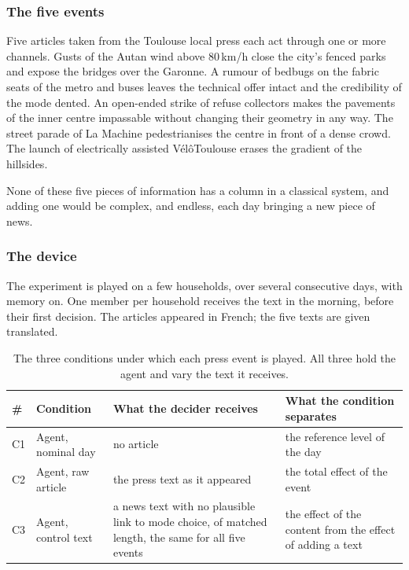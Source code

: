 \subsubsection{The five events}

Five articles taken from the Toulouse local press each act through one or more channels. Gusts of the Autan wind above 80\,km/h close the city's fenced parks and expose the bridges over the Garonne. A rumour of bedbugs on the fabric seats of the metro and buses leaves the technical offer intact and the credibility of the mode dented. An open-ended strike of refuse collectors makes the pavements of the inner centre impassable without changing their geometry in any way. The street parade of La Machine pedestrianises the centre in front of a dense crowd. The launch of electrically assisted V\'el\^oToulouse erases the gradient of the hillsides.

None of these five pieces of information has a column in a classical system, and adding one would be complex, and endless, each day bringing a new piece of news.

\subsubsection{The device}

The experiment is played on a few households, over several consecutive days, with memory on. One member per household receives the text in the morning, before their first decision. The articles appeared in French; the five texts are given translated.

\begin{table}[tp]
  \caption{The three conditions under which each press event is played. All three hold the agent and vary the text it receives.}
  \label{tab:conditions}
  \begin{tabular}{@{}llp{}p{}@{}}
    \toprule
    \# & Condition & What the decider receives & What the condition separates \\
    \midrule
    C1 & Agent, nominal day & no article & the reference level of the day \\
    C2 & Agent, raw article & the press text as it appeared & the total effect of the event \\
    C3 & Agent, control text & a news text with no plausible link to mode choice, of matched length, the same for all five events & the effect of the content from the effect of adding a text \\
    \bottomrule
  \end{tabular}
\end{table}

